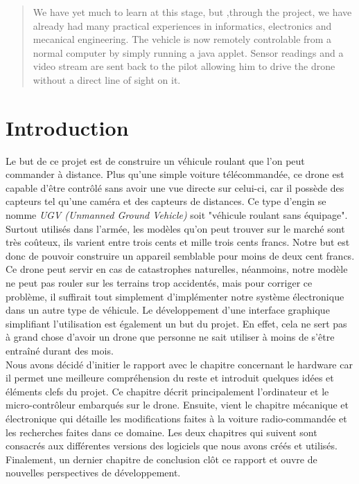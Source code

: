 \documentclass[a4paper,11pt]{report}
\begin{document}
{\begin{abstract}
We have yet much to learn at this stage, but ,through the project, we have
already had many 
practical experiences in informatics, electronics and mecanical
engineering. The vehicle is now remotely controlable from a normal computer by
simply running a java applet. Sensor readings and a video stream are sent back
to the pilot allowing him to drive the drone without a direct line of sight on
it.
     
\setcounter{page}{3}
\end{abstract}
\clearpage
{}
\tableofcontents
\clearpage
\listoffigures
\listoftables 
\clearpage

\section*{Introduction}
Le but de ce projet est de construire un véhicule roulant que l'on peut
commander à distance. Plus qu'une simple voiture télécommandée, ce drone est
capable d'être contrôlé sans avoir une vue directe sur celui-ci, car il
possède des capteurs tel qu'une caméra et des capteurs de distances. Ce type
d'engin se nomme \textit{UGV (Unmanned Ground Vehicle)} soit "véhicule roulant
sans équipage". Surtout utilisés dans l'armée, les modèles qu'on peut trouver
sur le marché sont très coûteux, ils varient entre trois cents et mille trois
cents francs. Notre but est donc de pouvoir construire un appareil semblable
pour moins de deux cent francs. 
Ce drone peut servir en cas de catastrophes
naturelles, néanmoins, notre modèle ne peut pas rouler sur les terrains trop
accidentés, mais pour corriger ce problème, il suffirait tout simplement
d'implémenter notre système électronique dans un autre type de véhicule. Le développement d'une interface graphique simplifiant l'utilisation est é\-ga\-le\-ment un but du projet. En effet, cela ne sert pas à grand chose d'avoir un drone que personne ne sait utiliser à moins de s'être entraîné durant des mois.\\
Nous avons décidé d'initier le rapport avec le chapitre concernant le hardware
car il permet une meilleure
compréhension du reste et introduit quel\-ques idées et éléments clefs du projet. Ce chapitre décrit principalement l'ordinateur et le
micro-contrôleur \cite{microcontroleur} embarqués sur le drone. Ensuite, vient
le chapitre mé\-ca\-ni\-que et électronique qui détaille les modifications
faites à la voiture ra\-dio-\-com\-man\-dée et les recherches faites dans ce
domaine. Les deux chapitres qui suivent sont consacrés aux différentes
versions des logiciels que nous avons créés et utilisés. Finalement, un dernier chapitre
de conclusion clôt ce rapport et ouvre de nouvelles perspectives de développement.
\clearpage


}
\end{document}
